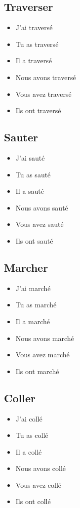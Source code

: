 \subsection{Traverser}

\begin{itemize}
    \item J'ai traversé
    \item Tu as traversé 
    \item Il a traversé 
    \item Nous avons traversé
    \item Vous avez traversé 
    \item Ils ont traversé 
\end{itemize}

\subsection{Sauter}

\begin{itemize}
    \item J'ai sauté 
    \item Tu as sauté 
    \item Il a sauté 
    \item Nous avons sauté 
    \item Vous avez sauté 
    \item Ils ont sauté
\end{itemize}

\subsection{Marcher}

\begin{itemize}
    \item J'ai marché 
    \item Tu as marché 
    \item Il a marché
    \item Nous avons marché 
    \item Vous avez marché
    \item Ils ont marché
\end{itemize}

\subsection{Coller}

\begin{itemize}
    \item J'ai collé 
    \item Tu as collé 
    \item Il a collé 
    \item Nous avons collé 
    \item Vous avez collé 
    \item Ils ont collé
\end{itemize}

